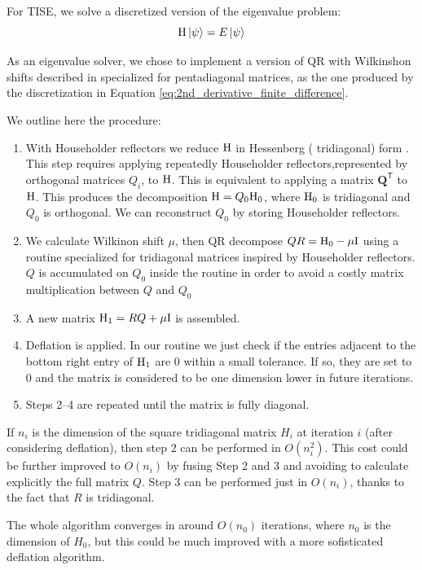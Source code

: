\documentclass[a4paper,11]{article}
\newcommand{\id}{\mathrm{I}}
\begin{document}
For TISE, we solve a discretized version of the eigenvalue problem:
\[
	\mathrm{H} \ket{\psi} = E \ket{\psi}
\]

As an eigenvalue solver, we chose to implement a version of 
QR with Wilkinshon shifts described in
\textcite[Lecture 29. QR Algotithm with shifts]{trefethen}
specialized for pentadiagonal matrices, as the one produced by the
discretization in Equation \ref{eq:2nd_derivative_finite_difference}.

We outline here the procedure:
\begin{enumerate}
	\item{
		With Householder reflectors we reduce $\mathrm{H}$ in Hessenberg (
		tridiagonal) form 
		\parencite[Lecture 26. Reduction to Hessenberg or Tridiagonal Form]
		{trefethen}. This step requires applying repeatedly Householder
		reflectors,represented by orthogonal matrices $Q_{i}$, to $\mathrm{H}$.{}
		This is equivalent to applying a matrix $\mathbf{Q}^{\mathsf{T}}$ to
		$\mathrm{H}$. This produces the decomposition $\mathrm{H} = Q_{0}\mathrm{H}_{0}$,
		where $\mathrm{H}_{0}$ is tridiagonal and $Q_{0}$ is orthogonal.
		We can reconstruct $Q_{0}$ by storing Householder reflectors.}
	\item{
		We calculate Wilkinon shift $\mu$, then QR decompose $QR = \ham_{0}-\mu \id$
		using a routine specialized for tridiagonal matrices inspired by
		Householder reflectors. $Q$ is accumulated on $Q_{0}$ inside the 
		routine in order to avoid a costly matrix multiplication between 
		$Q$ and $Q_{0}$
	}
	\item{
		A new matrix $\ham_{1} = RQ + \mu \id$ is assembled.
	}
	\item{
		Deflation is applied. In our routine we just check if the entries 
		adjacent to the bottom right entry of $\mathrm{H}_{1}$ are 0 within a small 
		tolerance. If so, they are set to 0 and the matrix is considered to
		be one dimension lower in future iterations.
	}
	\item{
		Steps 2--4 are repeated until the matrix is fully diagonal.
	}
\end{enumerate}

If $n_{i}$ is the dimension of the square tridiagonal matrix $H_{i}$ at 
iteration $i$ (after considering deflation), 
then step 2 can be performed in $O(n_{i}^{2})$. This cost
could be further improved to $O(n_{i})$ by fusing Step 2 and 3 and 
avoiding to calculate explicitly the full matrix $Q$. Step 3 can be performed 
just in $O(n_{i})$, thanks to the fact that $R$ is tridiagonal.

The whole algorithm converges in around $O(n_{0})$ iterations, where
$n_{0}$ is the dimension of $H_{0}$, but this could
be much improved with a more sofisticated deflation algorithm.
\end{document}
